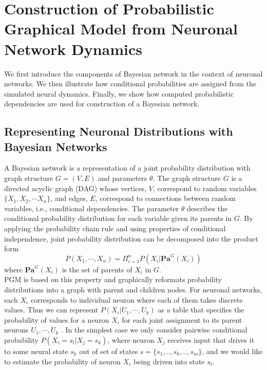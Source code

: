 \documentclass[letterpaper,11pt]{article}
\newcommand\tab[1][6mm]{\hspace*{#1}}
\begin{document}
\section{Construction of Probabilistic Graphical Model from Neuronal Network Dynamics}\label{sec:construction}
\tab We first introduce the components of Bayesian network in the context of neuronal networks. We then illustrate how conditional probabilities are assigned from the simulated neural dynamics. Finally, we show how computed probabilistic dependencies are used for construction of a Bayesian network.    

\subsection{Representing Neuronal Distributions with Bayesian Networks}
\tab A Bayesian network is a representation of a joint probability distribution with graph structure $G=(V, E)$ and parameters $\theta$. The graph structure $G$ is a directed acyclic graph (DAG) whose vertices, $V$, correspond to random variables $\{X_1, X_2, \cdots X_n\}$, and edges, $E$, correspond to connections between random variables, i.e., conditional dependencies. The parameter $\theta$ describes the conditional probability distribution for each variable given its parents in $G$. By applying the probability chain rule and using properties of conditional independence, joint probability distribution can be decomposed into the product form
\[P(X_1, \cdots, X_n)=\Pi_{i=1}^n P(X_i|\textbf{Pa}^G(X_i))\]
where $\textbf{Pa}^G(X_i)$ is the set of parents of $X_i$ in $G$.\\

PGM is based on this property and graphically reformats probability distributions into a graph with parent and children nodes. For neuronal networks, each $X_i$ corresponds to individual neuron where each of them takes discrete values. Thus we can represent $P(X_i|U_1, \cdots, U_k)$ as a table that specifies the probability of values for a neuron $X_i$ for each joint assignment to its parent neurons $U_1, \cdots, U_k$ \cite{Bayesian}. In the simplest case we only consider pairwise conditional probability $P(X_i=s_l|X_j=s_k)$, where neuron $X_j$ receives input that drives it to some neural state $s_k$ out of set of states $s=\{s_1,..,s_k,..,s_m\}$, and we would like to estimate the probability of neuron $X_i$ being driven into state $s_l$. 
\end{document}
